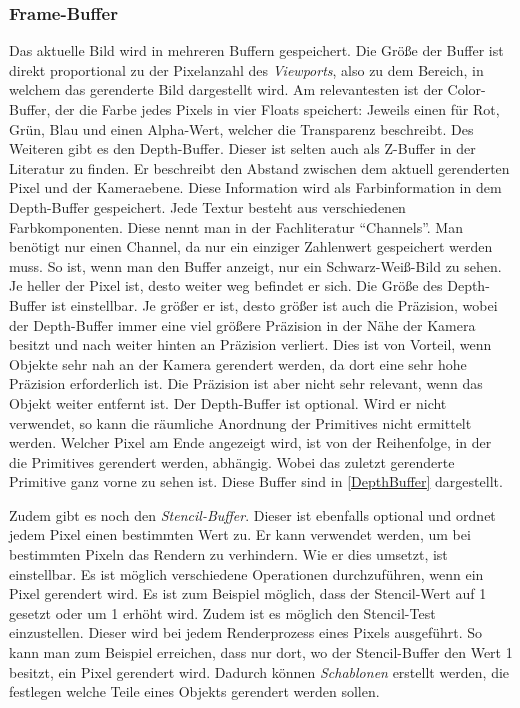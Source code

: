 \subsubsection{Frame-Buffer}
Das aktuelle Bild wird in mehreren Buffern gespeichert. Die Größe der Buffer ist direkt proportional zu der Pixelanzahl des \textit{Viewports}, also zu dem Bereich, in welchem das gerenderte Bild dargestellt wird. 
Am relevantesten ist der Color-Buffer, der die Farbe jedes Pixels in vier Floats speichert: Jeweils einen für Rot, Grün, Blau und einen Alpha-Wert, welcher die Transparenz beschreibt. Des Weiteren gibt es den Depth-Buffer. Dieser ist selten auch als Z-Buffer in der Literatur zu finden. Er beschreibt den Abstand zwischen dem aktuell gerenderten Pixel und der Kameraebene. Diese Information wird als Farbinformation in dem Depth-Buffer gespeichert. 
Jede Textur besteht aus verschiedenen Farbkomponenten. Diese nennt man in der Fachliteratur "`Channels"'.
Man benötigt nur einen Channel, da nur ein einziger Zahlenwert gespeichert werden muss. So ist, wenn man den Buffer anzeigt, nur ein Schwarz-Weiß-Bild zu sehen. 
Je heller der Pixel ist, desto weiter weg befindet er sich. Die Größe des Depth-Buffer ist einstellbar. Je größer er ist, desto größer ist auch die Präzision, wobei der Depth-Buffer immer eine viel größere Präzision in der Nähe der Kamera besitzt und nach weiter hinten an Präzision verliert. Dies ist von Vorteil, wenn Objekte sehr nah an der Kamera gerendert werden, da dort eine sehr hohe Präzision erforderlich ist. 
Die Präzision ist aber nicht sehr relevant, wenn das Objekt weiter entfernt ist. Der Depth-Buffer ist optional. Wird er nicht verwendet, so kann die räumliche Anordnung der Primitives nicht ermittelt werden. Welcher Pixel am Ende angezeigt wird, ist von der Reihenfolge, in der die Primitives gerendert werden, abhängig. Wobei das zuletzt gerenderte Primitive ganz vorne zu sehen ist. Diese Buffer sind in \cref{DepthBuffer} dargestellt. 

Zudem gibt es noch den \textit{Stencil-Buffer}. Dieser ist ebenfalls optional und ordnet jedem Pixel einen bestimmten Wert zu. Er kann verwendet werden, um bei bestimmten Pixeln das Rendern zu verhindern. Wie er dies umsetzt, ist einstellbar. Es ist möglich verschiedene Operationen durchzuführen, wenn ein Pixel gerendert wird. Es ist zum Beispiel möglich, dass der Stencil-Wert auf 1 gesetzt oder um 1 erhöht wird. 
Zudem ist es möglich den Stencil-Test einzustellen. Dieser wird bei jedem Renderprozess eines Pixels ausgeführt. So kann man zum Beispiel erreichen, dass nur dort, wo der Stencil-Buffer den Wert 1 besitzt, ein Pixel gerendert wird. Dadurch können \textit{Schablonen} erstellt werden, die festlegen welche Teile eines Objekts gerendert werden sollen.

